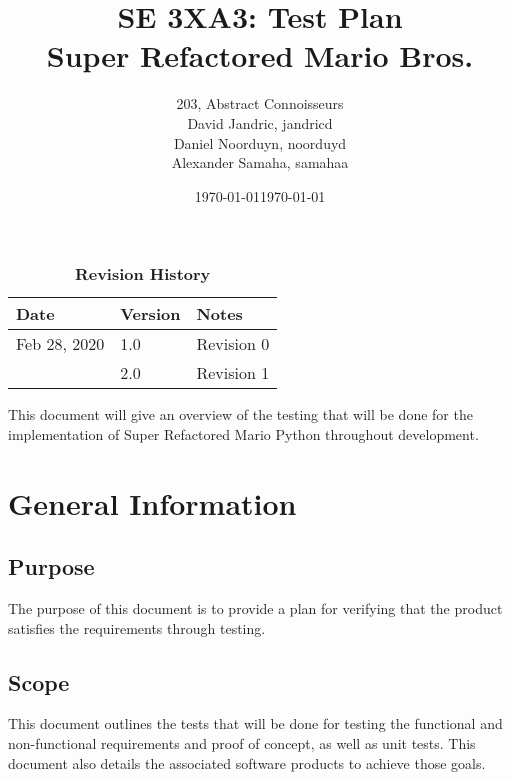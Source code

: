 \documentclass[12pt, titlepage]{article}
\title{SE 3XA3: Test Plan\\Super Refactored Mario Bros.}
\author{203, Abstract Connoisseurs
		\\ David Jandric, jandricd
		\\ Daniel Noorduyn, noorduyd
		\\ Alexander Samaha, samahaa
}
\date{\today}
\begin{document}
\maketitle

\tableofcontents
\listoftables
\listoffigures

\begin{table}[H]
\caption{\bf Revision History}
\begin{tabularx}{\textwidth}{p{3cm}p{2cm}X}
\toprule {\bf Date} & {\bf Version} & {\bf Notes}\\
\midrule
Feb 28, 2020 & 1.0 & Revision 0\\
\date{\today} & 2.0 & Revision 1\\
\bottomrule
\end{tabularx}
\end{table}

\newpage


This document will give an overview of the testing that will be done for the implementation of Super
Refactored Mario Python throughout development.



\section{General Information}

\subsection{Purpose}
The purpose of this document is to provide a plan for verifying that the product
satisfies the requirements through testing.



\subsection{Scope}
This document outlines the tests that will be done for testing the functional and non-functional requirements and proof of concept, as well as unit tests. This document also details the associated software products to achieve those goals.
\end{document}

